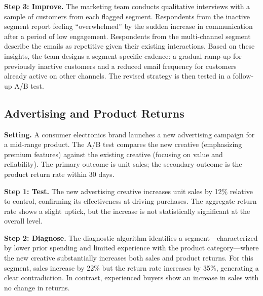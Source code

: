 \documentclass[11pt,letterpaper,english]{article}
\theoremstyle{definition}
\theoremstyle{definition}
\begin{document}
\begin{bibunit}
\vspace{4pt}
\noindent
\textbf{Step 3: Improve.}
The marketing team conducts qualitative interviews with a sample of customers from each flagged segment. Respondents from the inactive segment report feeling ``overwhelmed'' by the sudden increase in communication after a period of low engagement. Respondents from the multi-channel segment describe the emails as repetitive given their existing interactions. Based on these insights, the team designs a segment-specific cadence: a gradual ramp-up for previously inactive customers and a reduced email frequency for customers already active on other channels. The revised strategy is then tested in a follow-up A/B test.

\subsection{Advertising and Product Returns}
\label{sec:app-advertising}

\noindent
\textbf{Setting.} A consumer electronics brand launches a new advertising campaign for a mid-range product. The A/B test compares the new creative (emphasizing premium features) against the existing creative (focusing on value and reliability). The primary outcome is unit sales; the secondary outcome is the product return rate within 30 days.

\vspace{4pt}
\noindent
\textbf{Step 1: Test.}
The new advertising creative increases unit sales by 12\% relative to control, confirming its effectiveness at driving purchases. The aggregate return rate shows a slight uptick, but the increase is not statistically significant at the overall level.

\vspace{4pt}
\noindent
\textbf{Step 2: Diagnose.}
The diagnostic algorithm identifies a segment---characterized by lower prior spending and limited experience with the product category---where the new creative substantially increases both sales and product returns. For this segment, sales increase by 22\% but the return rate increases by 35\%, generating a clear contradiction. In contrast, experienced buyers show an increase in sales with no change in returns.


\end{bibunit}
\end{document}
